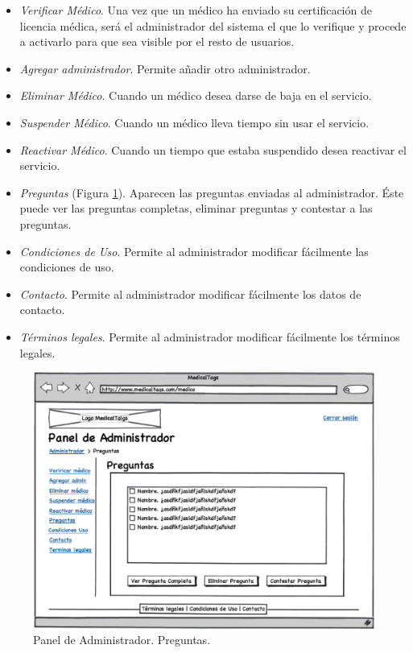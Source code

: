 \documentclass[a4paper,oneside,11pt]{book}
\begin{document}
		\begin{itemize}
			\item \textit{Verificar Médico}. Una vez que un médico ha enviado su certificación de licencia médica, será el administrador del sistema el que lo verifique y procede a activarlo para que sea visible por el resto de usuarios.
			\item \textit{Agregar administrador}. Permite añadir otro administrador.
			\item \textit{Eliminar Médico}. Cuando un médico desea darse de baja en el servicio.
			\item \textit{Suspender Médico}. Cuando un médico lleva tiempo sin usar el servicio.
			\item \textit{Reactivar Médico}. Cuando un tiempo que estaba suspendido desea reactivar el servicio.
			\item \textit{Preguntas} (Figura \ref{fig:admin_preguntas}). Aparecen las preguntas enviadas al administrador. Éste puede ver las preguntas completas, eliminar preguntas y contestar a las preguntas.
			\item \textit{Condiciones de Uso}. Permite al administrador modificar fácilmente las condiciones de uso.
			\item \textit{Contacto}. Permite al administrador modificar fácilmente los datos de contacto.
			\item \textit{Términos legales}. Permite al administrador modificar fácilmente los términos legales.
		\end{itemize}
	
		\begin{figure}[H]
		  \centering
		    \includegraphics[width=12cm]{img/eps/99_Administrador.eps}
		  \caption{Panel de Administrador. Preguntas.}
		  \label{fig:admin_preguntas}
		\end{figure}
	
\end{document}
